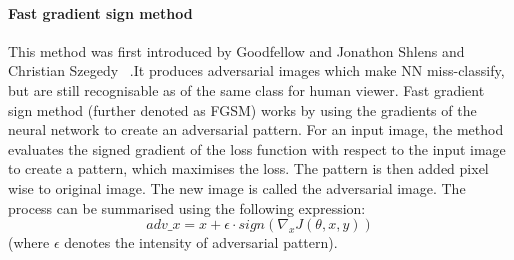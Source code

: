 \paragraph{Fast gradient sign method}
This method was first introduced by Goodfellow and Jonathon Shlens and Christian Szegedy
~\cite{goodfellow2015explaining}.It produces adversarial images which make NN miss-classify,
but are still recognisable as of the same class for human viewer.
Fast gradient sign method (further denoted as FGSM) works by using the gradients of the neural network to create an adversarial pattern.
For an input image, the method evaluates the signed gradient of the loss function with respect to the input image to create a pattern,
which maximises the loss.
The pattern is then added pixel wise to original image.
The new image is called the adversarial image.
The process can be summarised using the following expression:
\begin{equation}
    adv\_x = x + \epsilon \cdot sign(\nabla_x J(\theta, x, y))
\end{equation}
(where $\epsilon$ denotes the intensity of adversarial pattern).
\\

